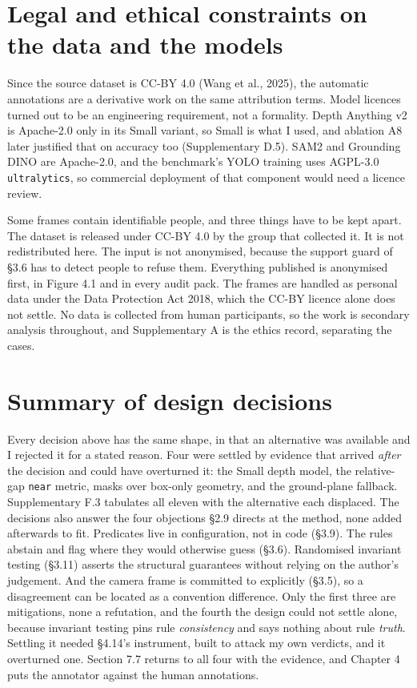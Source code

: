 \section{Legal and ethical constraints on the data and the models}

Since the source dataset is CC-BY 4.0 (Wang et al., 2025), the automatic annotations are a derivative work on the same attribution terms. Model licences turned out to be an engineering requirement, not a formality. Depth Anything v2 is Apache-2.0 only in its Small variant, so Small is what I used, and ablation A8 later justified that on accuracy too (Supplementary D.5). SAM2 and Grounding DINO are Apache-2.0, and the benchmark's YOLO training uses AGPL-3.0 \texttt{ultralytics}, so commercial deployment of that component would need a licence review.

Some frames contain identifiable people, and three things have to be kept apart. The dataset is released under CC-BY 4.0 by the group that collected it. It is not redistributed here. The input is not anonymised, because the support guard of \S{}3.6 has to detect people to refuse them. Everything published is anonymised first, in Figure 4.1 and in every audit pack. The frames are handled as personal data under the Data Protection Act 2018, which the CC-BY licence alone does not settle. No data is collected from human participants, so the work is secondary analysis throughout, and Supplementary A is the ethics record, separating the cases.

\section{Summary of design decisions}

Every decision above has the same shape, in that an alternative was available and I rejected it for a stated reason. Four were settled by evidence that arrived \textit{after} the decision and could have overturned it: the Small depth model, the relative-gap \texttt{near} metric, masks over box-only geometry, and the ground-plane fallback. Supplementary F.3 tabulates all eleven with the alternative each displaced. The decisions also answer the four objections \S{}2.9 directs at the method, none added afterwards to fit. Predicates live in configuration, not in code (\S{}3.9). The rules abstain and flag where they would otherwise guess (\S{}3.6). Randomised invariant testing (\S{}3.11) asserts the structural guarantees without relying on the author's judgement. And the camera frame is committed to explicitly (\S{}3.5), so a disagreement can be located as a convention difference. Only the first three are mitigations, none a refutation, and the fourth the design could not settle alone, because invariant testing pins rule \textit{consistency} and says nothing about rule \textit{truth}. Settling it needed \S{}4.14's instrument, built to attack my own verdicts, and it overturned one. Section 7.7 returns to all four with the evidence, and Chapter 4 puts the annotator against the human annotations.